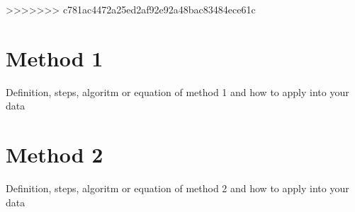 >>>>>>> c781ac4472a25ed2af92e92a48bac83484ece61c
\section{Method 1}
Definition, steps, algoritm or equation of method 1 and how to apply into your data
\section{Method 2}
Definition, steps, algoritm or equation of method 2 and how to apply into your data